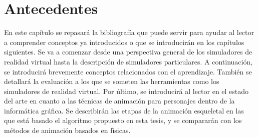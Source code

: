 \chapter{Antecedentes} 
\label{cap:related}

En este capítulo se repasará la bibliografía que puede servir para ayudar al lector a comprender conceptos ya introducidos o que se introducirán en los capítulos siguientes. Se va a comenzar desde una perspectiva general de los simuladores de realidad virtual hasta la descripción de simuladores particulares. A continuación, se introducirá brevemente conceptos relacionados con el aprendizaje. También se detallará  la evaluación a los que se someten las herramientas como los simuladores de realidad virtual. Por último, se introducirá al lector en el estado del arte en cuanto a las técnicas de animación para personajes dentro de la informática gráfica. Se describirán las etapas de la animación esqueletal en las que está basado el algoritmo propuesto en esta tesis, y se compararán con los métodos de animación basados en físicas.


